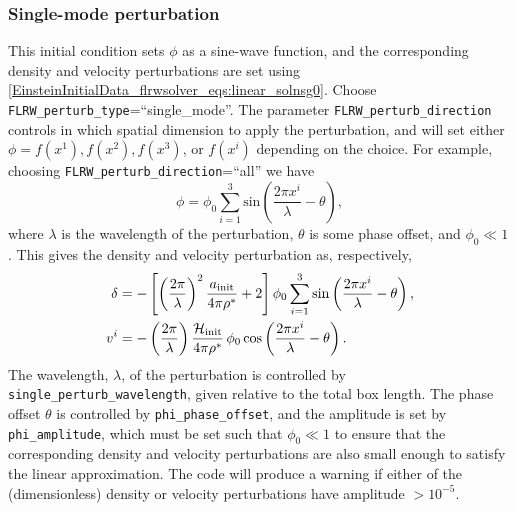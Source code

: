 \subsubsection{Single-mode perturbation}\label{EinsteinInitialData_flrwsolver_sec:singlemode_ics}

This initial condition sets $\phi$ as a sine-wave function, and the corresponding density and velocity perturbations are set using \eqref{EinsteinInitialData_flrwsolver_eqs:linear_solnsg0}. Choose \texttt{FLRW\_perturb\_type}=``single\_mode''. The parameter \texttt{FLRW\_perturb\_direction} controls in which spatial dimension to apply the perturbation, and will set either $\phi=f(x^1),f(x^2),f(x^3)$, or $f(x^i)$ depending on the choice. For example, choosing \texttt{FLRW\_perturb\_direction}=``all'' we have
\begin{equation}\label{EinsteinInitialData_flrwsolver_eq:phi}
	\phi = \phi_{0} \sum_{i=1}^{3} \mathrm{sin}\left(\frac{2\pi x^{i}}{\lambda} - \theta \right),
\end{equation}
where $\lambda$ is the wavelength of the perturbation, $\theta$ is some phase offset, and $\phi_0\ll1$. This gives the density and velocity perturbation as, respectively, \cite{EinsteinInitialData_flrwsolver_macpherson2017}
\begin{align} 
	\delta &= - \left[ \left(\frac{2\pi}{\lambda}\right)^{2} \frac{a_{\mathrm{init}}}{4\pi\rho^{*}} + 2\right] \phi_{0} \sum_{i=1}^{3} \mathrm{sin}\left(\frac{2\pi x^{i}}{\lambda} - \theta \right),\label{EinsteinInitialData_flrwsolver_eq:initial_delta}\\
	v^{i} &= -\left(\frac{2\pi}{\lambda}\right)\frac{\mathcal{H}_{\rm init}}{4\pi\rho^{*}}\, \phi_{0}\, \mathrm{cos}\left(\frac{2\pi x^{i}}{\lambda} - \theta \right). \label{EinsteinInitialData_flrwsolver_eq:initial_deltav}
\end{align}
The wavelength, $\lambda$, of the perturbation is controlled by \texttt{single\_perturb\_wavelength}, given relative to the total box length.
 The phase offset $\theta$ is controlled by {\tt phi\_phase\_offset}, and the amplitude is set by \texttt{phi\_amplitude}, which must be set such that $\phi_0\ll1$
 to ensure that the corresponding density and velocity perturbations are also small enough to satisfy the linear approximation. The code will produce a warning if either of the (dimensionless) density or velocity perturbations have amplitude $> 10^{-5}$. 

